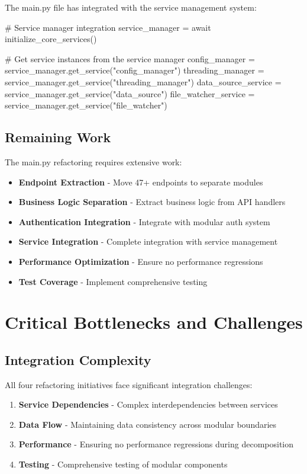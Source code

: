 \documentclass[11pt]{article}
\begin{document}
The main.py file has integrated with the service management system:

\begin{typescriptcode}
# Service manager integration
service_manager = await initialize_core_services()

# Get service instances from the service manager
config_manager = service_manager.get_service("config_manager")
threading_manager = service_manager.get_service("threading_manager")
data_source_service = service_manager.get_service("data_source")
file_watcher_service = service_manager.get_service("file_watcher")
\end{typescriptcode}

\subsection{Remaining Work}

The main.py refactoring requires extensive work:

\begin{itemize}
\item \textbf{Endpoint Extraction} - Move 47+ endpoints to separate modules
\item \textbf{Business Logic Separation} - Extract business logic from API handlers
\item \textbf{Authentication Integration} - Integrate with modular auth system
\item \textbf{Service Integration} - Complete integration with service management
\item \textbf{Performance Optimization} - Ensure no performance regressions
\item \textbf{Test Coverage} - Implement comprehensive testing
\end{itemize}

\section{Critical Bottlenecks and Challenges}

\subsection{Integration Complexity}

All four refactoring initiatives face significant integration challenges:

\begin{enumerate}
\item \textbf{Service Dependencies} - Complex interdependencies between services
\item \textbf{Data Flow} - Maintaining data consistency across modular boundaries
\item \textbf{Performance} - Ensuring no performance regressions during decomposition
\item \textbf{Testing} - Comprehensive testing of modular components
\end{enumerate}
\end{document}

